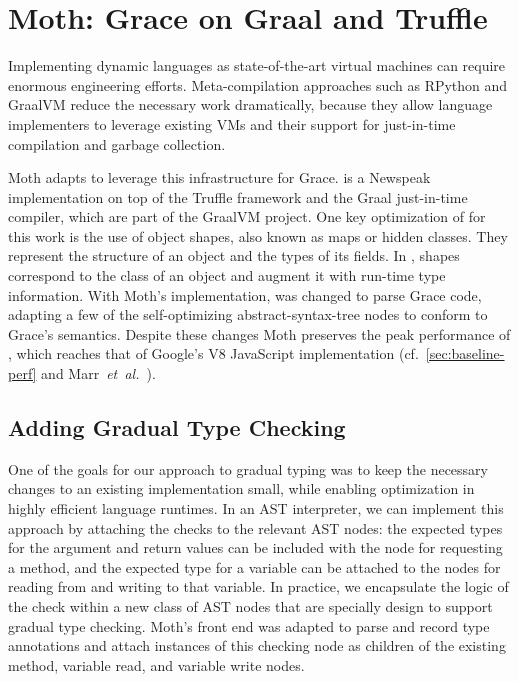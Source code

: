 
\section{Moth: Grace on Graal and Truffle}
\label{ssec:moth}
\label{sec:method}

Implementing dynamic languages as state-of-the-art virtual machines
can require enormous engineering efforts.
Meta-compilation approaches\citep{Marr:2015:MTPE}
such as RPython\citep{Bolz:2009:TMP,Bolz:2013:IMT}
and GraalVM\citep{Wurthinger2013,Wurthinger:2017:PPE}
reduce the necessary work dramatically,
because they allow language implementers to leverage existing VMs
and their support for just-in-time compilation and garbage collection.

Moth\citep{Roberts2017} adapts \SOMns\citep{SOMns} to leverage this infrastructure for Grace.
\SOMns is a Newspeak implementation\citep{Bracha:10:NS} on top of the Truffle framework and the Graal just-in-time compiler,
which are part of the GraalVM project.
One key optimization of \SOMns for this work is the use of
object shapes\citep{woss2014object},
also known as maps\citep{Self} or hidden classes.
They represent the structure of an object and the types of its fields.
In \SOMns, shapes correspond to the class of an object and augment it with
run-time type information.
%
%
With Moth's implementation,
\SOMns was changed to parse Grace code,
adapting a few of the self-optimizing abstract-syntax-tree nodes
to conform to Grace's semantics.
Despite these changes Moth
preserves the peak performance of \SOMns,
which reaches that of Google's V8 JavaScript implementation
(cf.\ \cref{sec:baseline-perf} and Marr~\textit{et~al.}~\cite{Marr2016}).

\subsection{Adding Gradual Type Checking} 
\label{ssec:implementation} 



One of the goals for our approach to gradual typing was to keep
the necessary changes to an existing implementation small,
while enabling optimization in highly efficient language runtimes.
%
In an AST interpreter, we can implement this approach by attaching the
checks to the relevant AST nodes: the expected types for the argument
and return values can be included with the node for requesting a
method, and the expected type for a variable can be attached to the
nodes for reading from and writing to that variable.  In practice, we
encapsulate the logic of the check within a new class of AST
nodes that are specially design to support gradual type checking.
Moth's front end was adapted to parse and record type
annotations and attach instances of this checking node as children of the
existing method, variable read, and variable write nodes.


